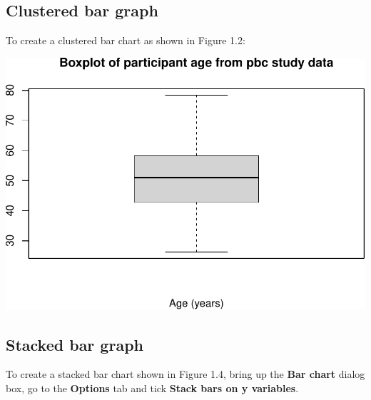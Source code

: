 \documentclass[
]{memoir}
\newenvironment{Shaded}{\begin{snugshade}}{\end{snugshade}}
\newcommand{\AttributeTok}[1]{\textcolor[rgb]{0.77,0.63,0.00}{#1}}
\newcommand{\ConstantTok}[1]{\textcolor[rgb]{0.00,0.00,0.00}{#1}}
\newcommand{\FunctionTok}[1]{\textcolor[rgb]{0.00,0.00,0.00}{#1}}
\newcommand{\NormalTok}[1]{#1}
\newcommand{\OtherTok}[1]{\textcolor[rgb]{0.56,0.35,0.01}{#1}}
\newcommand{\SpecialCharTok}[1]{\textcolor[rgb]{0.00,0.00,0.00}{#1}}
\newcommand{\StringTok}[1]{\textcolor[rgb]{0.31,0.60,0.02}{#1}}
\begin{document}
\hypertarget{clustered-bar-graph}{%
\subsection{Clustered bar graph}\label{clustered-bar-graph}}

To create a clustered bar chart as shown in Figure 1.2:

\begin{Shaded}
\end{Shaded}

\includegraphics{phcm9795-R-notes_files/figure-latex/unnamed-chunk-35-1.pdf}

\hypertarget{stacked-bar-graph}{%
\subsection{Stacked bar graph}\label{stacked-bar-graph}}

To create a stacked bar chart shown in Figure 1.4, bring up the \textbf{Bar chart} dialog box, go to the \textbf{Options} tab and tick \textbf{Stack bars on y variables}.
\end{document}
